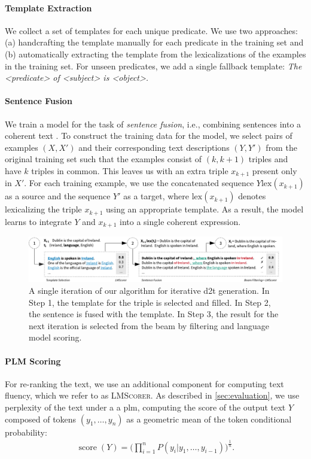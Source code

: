 \paragraph{Template Extraction}
We collect a set of templates for each unique predicate. We use two approaches: (a) handcrafting the template manually for each predicate in the training set and (b) automatically extracting the template from the lexicalizations of the examples in the training set. For unseen predicates, we add a single fallback template: \textit{The <predicate> of <subject> is <object>.}


\paragraph{Sentence Fusion}
We train a model for the task of \emph{sentence fusion}, i.e., combining sentences into a coherent text \cite{barzilay2005sentence}.
To construct the training data for the model, we select pairs of examples $(X, X')$ and their corresponding text descriptions $(Y, Y')$ from the original training set such that the examples consist of $(k, k+1)$ triples and have $k$ triples in common. This leaves us with an extra triple $x_{k+1}$ present only in $X'$. For each training example, we use the concatenated sequence $Y \mathrm{lex}(x_{k+1})$ as a source and the sequence $Y'$ as a target, where $\mathrm{lex}(x_{k+1})$ denotes lexicalizing the triple $x_{k+1}$ using an appropriate template.
As a result, the model learns to integrate $Y$ and $x_{k+1}$ into a single coherent expression.


\begin{figure}[t]
    \centering
    \includegraphics[width=\textwidth]{img/d2t_text_editing}
    \caption[Iterative data-to-text generation.]{A single iteration of our algorithm for iterative \ac{d2t} generation. In Step 1, the template for the triple is selected and filled. In Step 2, the sentence is fused with the template. In Step 3, the result for the next iteration is selected from the beam by filtering and language model scoring.}\label{fig:iterative:alg}
\end{figure}



\paragraph{PLM Scoring} For re-ranking the text, we use an additional component for computing text fluency, which we refer to as \textsc{LMScorer}.
As described in \autoref{sec:evaluation}, we use perplexity of the text under a a \ac{plm}, computing the score of the output text $Y$ composed of tokens $(y_1, \ldots, y_n)$ as a geometric mean of the token conditional probability:
\begin{align}
    \operatorname{score}(Y) = \Bigg( \prod_{i=1}^{n}{P(y_i|y_1, \ldots, y_{i-1})} \Bigg)^{\frac{1}{n}}.
\end{align}




